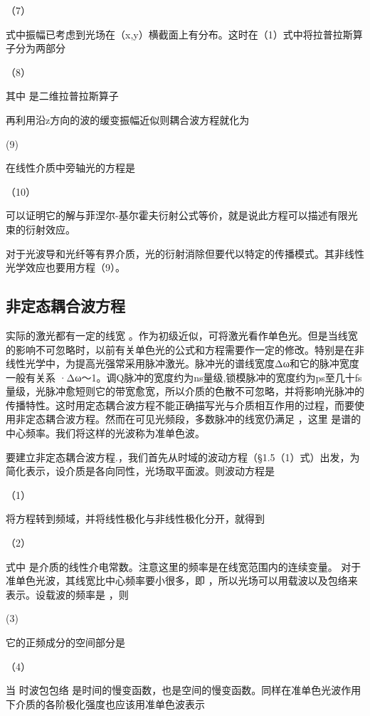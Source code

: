                            （7）

式中振幅已考虑到光场在（x,y）横截面上有分布。这时在（1）式中将拉普拉斯算子分为两部分

                              （8）

其中 是二维拉普拉斯算子 

再利用沿z方向的波的缓变振幅近似则耦合波方程就化为

               (9)

在线性介质中旁轴光的方程是

                                  （10）

可以证明它的解与菲涅尔-基尔霍夫衍射公式等价，就是说此方程可以描述有限光束的衍射效应。

对于光波导和光纤等有界介质，光的衍射消除但要代以特定的传播模式。其非线性光学效应也要用方程（9）。


\subsection{非定态耦合波方程}
实际的激光都有一定的线宽 。作为初级近似，可将激光看作单色光。但是当线宽的影响不可忽略时，以前有关单色光的公式和方程需要作一定的修改。特别是在非线性光学中，为提高光强常采用脉冲激光。脉冲光的谱线宽度Δω和它的脉冲宽度一般有关系 ·Δω～1。调Q脉冲的宽度约为ns量级,锁模脉冲的宽度约为ps至几十fs量级，光脉冲愈短则它的带宽愈宽，所以介质的色散不可忽略，并将影响光脉冲的传播特性。这时用定态耦合波方程不能正确描写光与介质相互作用的过程，而要使用非定态耦合波方程。然而在可见光频段，多数脉冲的线宽仍满足 ，这里 是谱的中心频率。我们将这样的光波称为准单色波。

要建立非定态耦合波方程.，我们首先从时域的波动方程（§1.5（1）式）出发，为简化表示，设介质是各向同性，光场取平面波。则波动方程是

                          （1）

将方程转到频域，并将线性极化与非线性极化分开，就得到

                           （2）

式中 是介质的线性介电常数。注意这里的频率是在线宽范围内的连续变量。 对于准单色光波，其线宽比中心频率要小很多，即 ，所以光场可以用载波以及包络来表示。设载波的频率是 ，则

                              (3)

它的正频成分的空间部分是

                        （4）      

当 时波包包络 是时间的慢变函数，也是空间的慢变函数。同样在准单色光波作用下介质的各阶极化强度也应该用准单色波表示

